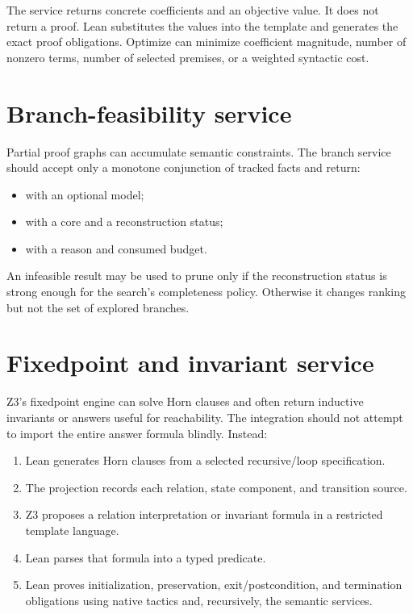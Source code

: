 \documentclass[11pt,letterpaper,openany]{report}
\newcommand{\code}[1]{\texttt{\detokenize{#1}}}
\begin{document}
The service returns concrete coefficients and an objective value. It does not return a
proof. Lean substitutes the values into the template and generates the exact proof
obligations. Optimize can minimize coefficient magnitude, number of nonzero terms,
number of selected premises, or a weighted syntactic cost.

\section{Branch-feasibility service}

Partial proof graphs can accumulate semantic constraints. The branch service should
accept only a monotone conjunction of tracked facts and return:

\begin{itemize}
  \item \code{Feasible} with an optional model;
  \item \code{Infeasible} with a core and a reconstruction status;
  \item \code{Unknown} with a reason and consumed budget.
\end{itemize}

An infeasible result may be used to prune only if the reconstruction status is strong
enough for the search's completeness policy. Otherwise it changes ranking but not the
set of explored branches.

\section{Fixedpoint and invariant service}

Z3's fixedpoint engine can solve Horn clauses and often return inductive invariants or
answers useful for reachability. The integration should not attempt to import the
entire answer formula blindly. Instead:

\begin{enumerate}
  \item Lean generates Horn clauses from a selected recursive/loop specification.
  \item The projection records each relation, state component, and transition source.
  \item Z3 proposes a relation interpretation or invariant formula in a restricted
        template language.
  \item Lean parses that formula into a typed predicate.
  \item Lean proves initialization, preservation, exit/postcondition, and termination
        obligations using native tactics and, recursively, the semantic services.
\end{enumerate}
\end{document}

